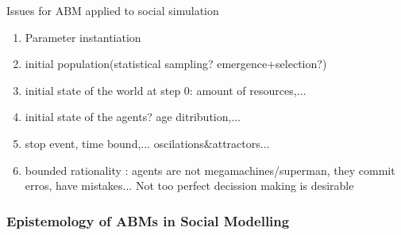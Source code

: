 \documentclass[11pt,oneside,a4paper,openright]{report}
\begin{document}
Issues for ABM applied to social simulation 

\begin{enumerate}[i-]
\item Parameter instantiation
\item initial population(statistical sampling? emergence+selection?) 
\item initial state of the world at step 0: amount of resources,... 
\item initial state of the agents? age ditribution,...
\item stop event, time bound,... oscilations&attractors...
\item bounded rationality : agents are not megamachines/superman, they commit erros, have mistakes... Not too perfect
decission making is desirable
\end{enumerate}


\subsubsection{Epistemology of ABMs in Social Modelling}
\end{document}
